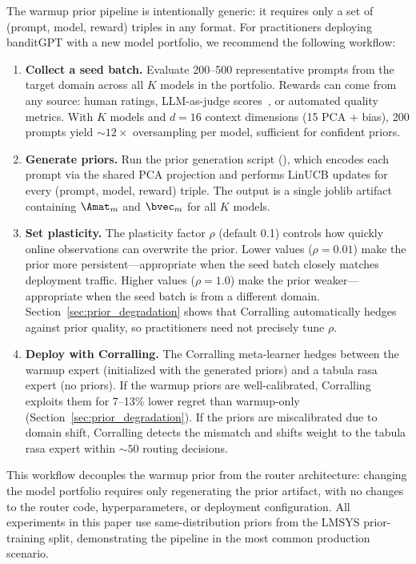 The warmup prior pipeline is intentionally generic: it requires only a set of (prompt, model, reward) triples in any format.
For practitioners deploying banditGPT with a new model portfolio, we recommend the following workflow:

\begin{enumerate}[nosep]
\item \textbf{Collect a seed batch.}
Evaluate 200--500 representative prompts from the target domain across all $K$ models in the portfolio.
Rewards can come from any source: human ratings, LLM-as-judge scores~\cite{zheng2023judging}, or automated quality metrics.
With $K$ models and $d{=}16$ context dimensions (15 PCA + bias), 200 prompts yield ${\sim}12\times$ oversampling per model, sufficient for confident priors.

\item \textbf{Generate priors.}
Run the prior generation script (), which encodes each prompt via the shared PCA projection and performs LinUCB updates for every (prompt, model, reward) triple.
The output is a single joblib artifact containing $\Amat_m$ and $\bvec_m$ for all $K$ models.

\item \textbf{Set plasticity.}
The plasticity factor $\rho$ (default 0.1) controls how quickly online observations can overwrite the prior.
Lower values ($\rho{=}0.01$) make the prior more persistent---appropriate when the seed batch closely matches deployment traffic.
Higher values ($\rho{=}1.0$) make the prior weaker---appropriate when the seed batch is from a different domain.
Section~\ref{sec:prior_degradation} shows that Corralling automatically hedges against prior quality, so practitioners need not precisely tune $\rho$.

\item \textbf{Deploy with Corralling.}
The Corralling meta-learner hedges between the warmup expert (initialized with the generated priors) and a tabula rasa expert (no priors).
If the warmup priors are well-calibrated, Corralling exploits them for 7--13\% lower regret than warmup-only (Section~\ref{sec:prior_degradation}).
If the priors are miscalibrated due to domain shift, Corralling detects the mismatch and shifts weight to the tabula rasa expert within ${\sim}50$ routing decisions.
\end{enumerate}

\noindent This workflow decouples the warmup prior from the router architecture: changing the model portfolio requires only regenerating the prior artifact, with no changes to the router code, hyperparameters, or deployment configuration.
All experiments in this paper use same-distribution priors from the LMSYS prior-training split, demonstrating the pipeline in the most common production scenario.
